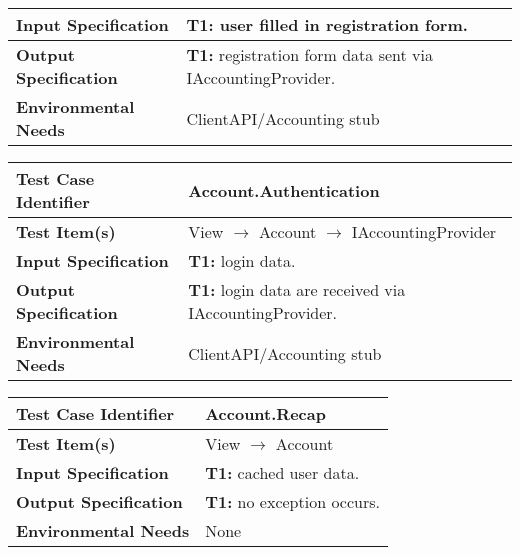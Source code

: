 {\begin{tabularx}{\textwidth}{l X}
    \textbf{Input Specification}  & \textbf{T1:} user filled in registration form.\\
    \hline 
    
    \textbf{Output Specification} & \textbf{T1:} registration form data sent via IAccountingProvider.\\
    \hline 
    
    \textbf{Environmental Needs} & ClientAPI/Accounting stub\\
    \hline
\end{tabularx}
\bigskip 

\noindent
\begin{tabularx}{\textwidth}{l X}
    \hline 
    \textbf{Test Case Identifier} & Account.Authentication\\ 
    \hline 
    
    \textbf{Test Item(s)} & View $\rightarrow$ Account $\rightarrow$ IAccountingProvider\\
    \hline 
    
    \textbf{Input Specification} & \textbf{T1:} login data.\\
    \hline 
    
    \textbf{Output Specification} & \textbf{T1:} login data are received via IAccountingProvider.\\
    \hline 
    
    \textbf{Environmental Needs} & ClientAPI/Accounting stub\\
    \hline
\end{tabularx}
\bigskip 

\noindent
\begin{tabularx}{\textwidth}{l X}
    \hline 
    \textbf{Test Case Identifier} & Account.Recap\\
    \hline 
    
    \textbf{Test Item(s)} & View $\rightarrow$ Account\\
    \hline 
    
    \textbf{Input Specification} & \textbf{T1:} cached user data.\\
    \hline 
    
    \textbf{Output Specification} & \textbf{T1:} no exception occurs.\\
    \hline 
    
    \textbf{Environmental Needs} & None\\
    \hline
\end{tabularx}
\bigskip 

}
